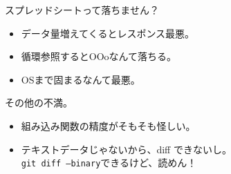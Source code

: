 \newenvironment{commandline0}%
{\VerbatimEnvironment
  \begin{Sbox}\begin{minipage}{0.9\hsize}\begin{fontsize}{5}{5} \begin{BVerbatim}}%
{\end{BVerbatim}\end{fontsize}\end{minipage}\end{Sbox}
  \setlength{\fboxsep}{10pt}

\vspace{10pt}%
\fcolorbox{dancerdarkblue}{dancerlightblue}{\TheSbox}

\vspace{6pt}%
}



\frame{\titlepage{}}

\begin{frame}{スプレッドシートって落ちません？}
\begin{itemize}
 \item データ量増えてくるとレスポンス最悪。
 \item 循環参照するとOOoなんて落ちる。
 \item OSまで固まるなんて最悪。
\end{itemize}

その他の不満。
\begin{itemize}
 \item 組み込み関数の精度がそもそも怪しい。
 \item テキストデータじゃないから、diff できないし。\\
       \texttt{git diff --binary}できるけど、読めん！
\end{itemize}
\end{frame}

